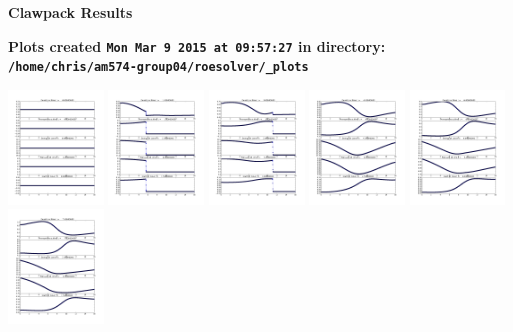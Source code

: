 \documentclass[11pt]{article}
\begin{document}
        \begin{center}{\Large\bf Clawpack Results}\vskip 5pt
        
        \bf Plots created {\tt Mon Mar  9 2015 at 09:57:27} in directory: \vskip 5pt
        \verb+/home/chris/am574-group04/roesolver/_plots+
        \end{center}
        \vskip 5pt
        \includegraphics[width=0.19\textwidth]{frame0000fig1.png}
\vskip 10pt 
\includegraphics[width=0.19\textwidth]{frame0001fig1.png}
\vskip 10pt 
\includegraphics[width=0.19\textwidth]{frame0002fig1.png}
\vskip 10pt 
\includegraphics[width=0.19\textwidth]{frame0003fig1.png}
\vskip 10pt 
\includegraphics[width=0.19\textwidth]{frame0004fig1.png}
\vskip 10pt 
\includegraphics[width=0.19\textwidth]{frame0005fig1.png}
\end{document}

